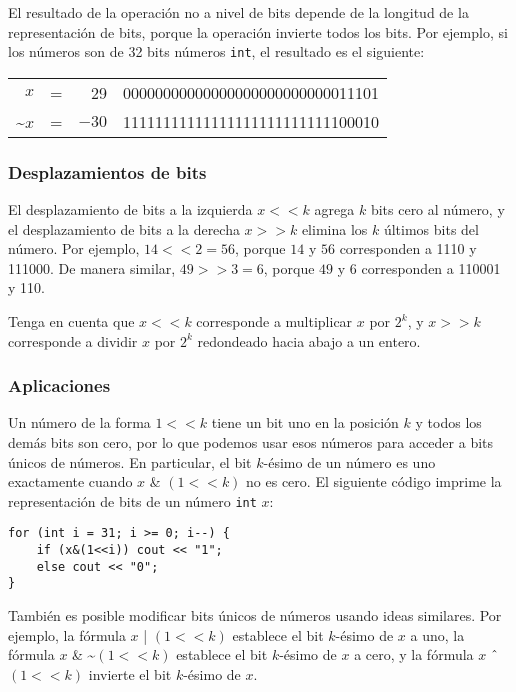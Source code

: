 El resultado de la operación no a nivel de bits
depende de la longitud de la representación de bits,
porque la operación invierte todos los bits.
Por ejemplo, si los números son de 32 bits
números \texttt{int}, el resultado es el siguiente:



\begin{center}
\begin{tabular}{rrrr}
$x$ & = & 29 &   00000000000000000000000000011101 \\
\textasciitilde$x$ & = & $-30$ & 11111111111111111111111111100010 \\
\end{tabular}
\end{center}

\subsubsection{Desplazamientos de bits}


El desplazamiento de bits a la izquierda $x < < k$ agrega $k$
bits cero al número,
y el desplazamiento de bits a la derecha $x > > k$
elimina los $k$ últimos bits del número.
Por ejemplo, $14 < < 2 = 56$,
porque $14$ y $56$ corresponden a 1110 y 111000.
De manera similar, $49 > > 3 = 6$,
porque $49$ y $6$ corresponden a 110001 y 110.

Tenga en cuenta que $x < < k$
corresponde a multiplicar $x$ por $2^k$,
y $x > > k$
corresponde a dividir $x$ por $2^k$
redondeado hacia abajo a un entero.

\subsubsection{Aplicaciones}

Un número de la forma $1 < < k$ tiene un bit uno
en la posición $k$ y todos los demás bits son cero,
por lo que podemos usar esos números para acceder a bits únicos de números.
En particular, el bit $k$-ésimo de un número es uno
exactamente cuando $x$ \& $(1 < < k)$ no es cero.
El siguiente código imprime la representación de bits
de un número \texttt{int} $x$:

\begin{lstlisting}
for (int i = 31; i >= 0; i--) {
    if (x&(1<<i)) cout << "1";
    else cout << "0";
}
\end{lstlisting}

También es posible modificar bits únicos
de números usando ideas similares.
Por ejemplo, la fórmula $x$ | $(1 < < k)$
establece el bit $k$-ésimo de $x$ a uno,
la fórmula
$x$ \& \textasciitilde $(1 < < k)$
establece el bit $k$-ésimo de $x$ a cero,
y la fórmula
$x$ $\XOR$ $(1 < < k)$
invierte el bit $k$-ésimo de $x$.

